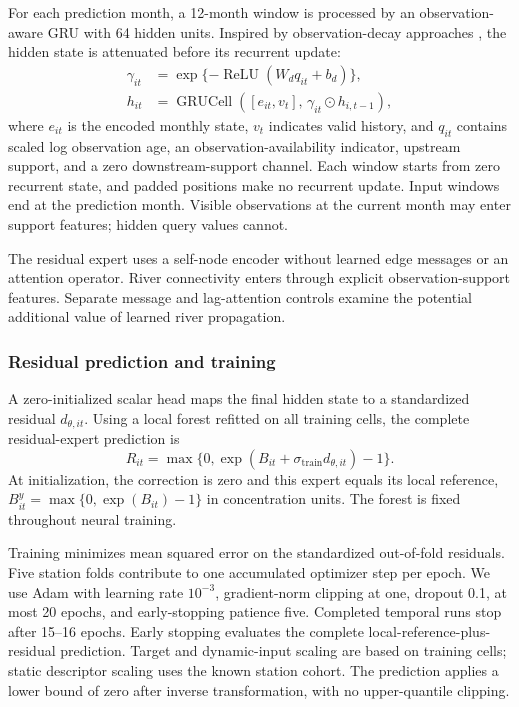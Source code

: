 \documentclass[11pt]{article}
\begin{document}
For each prediction month, a 12-month window is processed by an observation-aware GRU with 64 hidden units. Inspired by observation-decay approaches \citep{che2018}, the hidden state is attenuated before its recurrent update:
\begin{align}
 \gamma_{it}&=\exp\{-\operatorname{ReLU}(W_d q_{it}+b_d)\},\\
 h_{it}&=\operatorname{GRUCell}([e_{it},v_t],\,\gamma_{it}\odot h_{i,t-1}),
\end{align}
where $e_{it}$ is the encoded monthly state, $v_t$ indicates valid history, and $q_{it}$ contains scaled log observation age, an observation-availability indicator, upstream support, and a zero downstream-support channel. Each window starts from zero recurrent state, and padded positions make no recurrent update. Input windows end at the prediction month. Visible observations at the current month may enter support features; hidden query values cannot.

The residual expert uses a self-node encoder without learned edge messages or an attention operator. River connectivity enters through explicit observation-support features. Separate message and lag-attention controls examine the potential additional value of learned river propagation.

\subsubsection{Residual prediction and training}
A zero-initialized scalar head maps the final hidden state to a standardized residual $d_{\theta,it}$. Using a local forest refitted on all training cells, the complete residual-expert prediction is
\begin{equation}
 R_{it}=\max\{0,\exp(B_{it}+\sigma_{\mathrm{train}}d_{\theta,it})-1\}.
 \label{eq:residual}
\end{equation}
At initialization, the correction is zero and this expert equals its local reference, $B^y_{it}=\max\{0,\exp(B_{it})-1\}$ in concentration units. The forest is fixed throughout neural training.

Training minimizes mean squared error on the standardized out-of-fold residuals. Five station folds contribute to one accumulated optimizer step per epoch. We use Adam with learning rate $10^{-3}$, gradient-norm clipping at one, dropout 0.1, at most 20 epochs, and early-stopping patience five. Completed temporal runs stop after 15--16 epochs. Early stopping evaluates the complete local-reference-plus-residual prediction. Target and dynamic-input scaling are based on training cells; static descriptor scaling uses the known station cohort. The prediction applies a lower bound of zero after inverse transformation, with no upper-quantile clipping.
\end{document}
